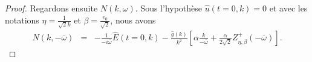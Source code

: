 \begin{proof}
  Regardons ensuite $N(k,\omega)$. Sous l'hypothèse $\hat{u}(t=0,k)=0$ et avec les notations $\eta=\frac{1}{\sqrt{2}k}$ et $\beta=\frac{v_0}{\sqrt{2}}$, nous avons
  \begin{eqnarray*}
    N(k,-\overline{\omega})&=&-\frac{1}{-i\overline{\omega}}\hat{E}(t=0,k)-\frac{\hat{g}(k)}{ k^2}\left[\alpha\frac{k}{-\overline{\omega}}+\frac{\alpha}{2\sqrt{2}}Z_{\eta,\beta}^+\left(-\overline{\omega}\right)\right].
  \end{eqnarray*}

\end{proof}
